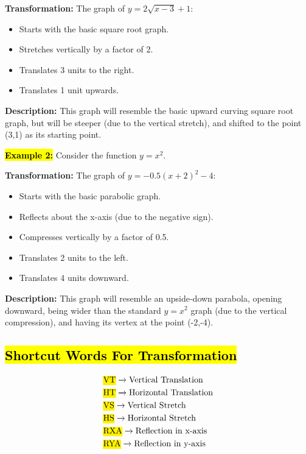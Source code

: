 \documentclass[12pt,a4paper]{article}
\begin{document}
\textbf{Transformation:} The graph of \(y = 2\sqrt{x-3} + 1\):

\begin{itemize}
    \item Starts with the basic square root graph.
    \item Stretches vertically by a factor of 2.
    \item Translates 3 units to the right.
    \item Translates 1 unit upwards.
\end{itemize}

\textbf{Description:} This graph will resemble the basic upward curving square root graph, but will be steeper (due to the vertical stretch), and shifted to the point (3,1) as its starting point.

\textbf{\hl{Example 2:}} Consider the function \(y = x^2\).

\textbf{Transformation:} The graph of \(y = -0.5(x+2)^2 - 4\):

\begin{itemize}
    \item Starts with the basic parabolic graph.
    \item Reflects about the x-axis (due to the negative sign).
    \item Compresses vertically by a factor of 0.5.
    \item Translates 2 units to the left.
    \item Translates 4 units downward.
\end{itemize}

\textbf{Description:} This graph will resemble an upside-down parabola, opening downward, being wider than the standard \(y = x^2\) graph (due to the vertical compression), and having its vertex at the point (-2,-4).
\subsection*{\hl{Shortcut Words For Transformation}}
\begin{align*}
    & \text{\hl{VT}} \xrightarrow{} \text{Vertical Translation} \\
    & \text{\hl{HT}} \xrightarrow{} \text{Horizontal Translation} \\
    & \text{\hl{VS}} \xrightarrow{} \text{Vertical Stretch} \\
    & \text{\hl{HS}} \xrightarrow{} \text{Horizontal Stretch} \\
    & \text{\hl{RXA}} \xrightarrow{} \text{Reflection in x-axis} \\
    & \text{\hl{RYA}} \xrightarrow{} \text{Reflection in y-axis} \\
\end{align*}
\end{document}

